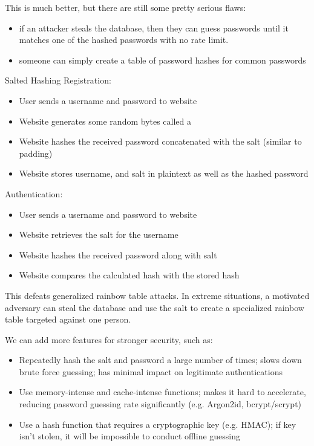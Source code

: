 This is much better, but there are still some pretty serious flaws:
\begin{itemize}[noitemsep]
    \item {} if an attacker steals the database, then they can guess passwords until it matches one of the hashed passwords with no rate limit.
    \item {} someone can simply create a table of password hashes for common passwords
\end{itemize}

\begin{exbox}{Salted Hashing}{}
    Registration:
    \begin{itemize}[noitemsep]
        \item User sends a username and password to website
        \item Website generates some random bytes called a 
        \item Website hashes the received password concatenated with the salt (similar to padding)
        \item Website stores username, and salt in plaintext as well as the hashed password
    \end{itemize}
    Authentication:
    \begin{itemize}[noitemsep]
        \item User sends a username and password to website
        \item Website retrieves the salt for the username
        \item Website hashes the received password along with salt
        \item Website compares the calculated hash with the stored hash
    \end{itemize}
\end{exbox}

This defeats generalized rainbow table attacks. In extreme situations, a motivated adversary can steal the database and use the salt to create a specialized rainbow table targeted against one person.

We can add more features for stronger security, such as:
\begin{itemize}[noitemsep]
    \item {} Repeatedly hash the salt and password a large number of times; slows down brute force guessing; has minimal impact on legitimate authentications
    \item {} Use memory-intense and cache-intense functions; makes it hard to accelerate, reducing password guessing rate significantly (e.g. Argon2id, bcrypt/scrypt)
    \item {} Use a hash function that requires a cryptographic key (e.g. HMAC); if key isn't stolen, it will be impossible to conduct offline guessing
\end{itemize}

